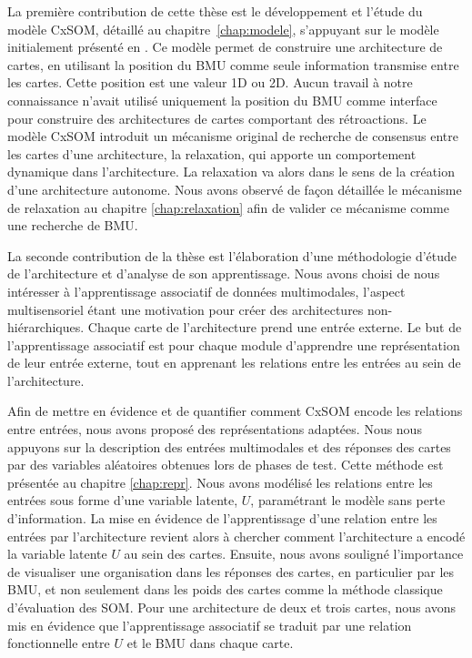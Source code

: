 La première contribution de cette thèse est le développement et l'étude du modèle CxSOM, détaillé au chapitre~\ref{chap:modele}, s'appuyant sur le modèle initialement présenté en \cite{baheux_towards_2014}.
Ce modèle permet de construire une architecture de cartes, en utilisant la position du BMU comme seule information transmise entre les cartes. 
Cette position est une valeur 1D ou 2D. Aucun travail à notre connaissance n'avait utilisé uniquement la position du BMU comme interface pour construire des architectures de cartes comportant des rétroactions.
Le modèle CxSOM introduit un mécanisme original de recherche de consensus entre les cartes d'une architecture, la relaxation, qui apporte un comportement dynamique dans l'architecture.
La relaxation va alors dans le sens de la création d'une architecture autonome.
Nous avons observé de façon détaillée le mécanisme de relaxation au chapitre \ref{chap:relaxation} afin de valider ce mécanisme comme une recherche de BMU.

La seconde contribution de la thèse est l'élaboration d'une méthodologie d'étude de l'architecture et d'analyse de son apprentissage. 
Nous avons choisi de nous intéresser à l'apprentissage associatif de données multimodales, l'aspect multisensoriel étant une motivation pour créer des architectures non-hiérarchiques. Chaque carte de l'architecture prend une entrée externe. 
Le but de l'apprentissage associatif est pour chaque module d'apprendre une représentation de leur entrée externe, tout en apprenant les relations entre les entrées au sein de l'architecture.


Afin de mettre en évidence et de quantifier comment CxSOM encode les relations entre entrées, nous avons proposé des représentations adaptées. Nous nous appuyons sur la description des entrées multimodales et des réponses des cartes par des variables aléatoires obtenues lors de phases de test. Cette méthode est présentée au chapitre \ref{chap:repr}.
Nous avons modélisé les relations entre les entrées sous forme d'une variable latente, $U$, paramétrant le modèle sans perte d'information. La mise en évidence de l'apprentissage d'une relation entre les entrées par l'architecture revient alors à chercher comment l'architecture a encodé la variable latente $U$ au sein des cartes.
Ensuite, nous avons souligné l'importance de visualiser une organisation dans les réponses des cartes, en particulier par les BMU, et non seulement dans les poids des cartes comme la méthode classique d'évaluation des SOM.
Pour une architecture de deux et trois cartes, nous avons mis en évidence que l'apprentissage associatif se traduit par une relation fonctionnelle entre $U$ et le BMU dans chaque carte. 


